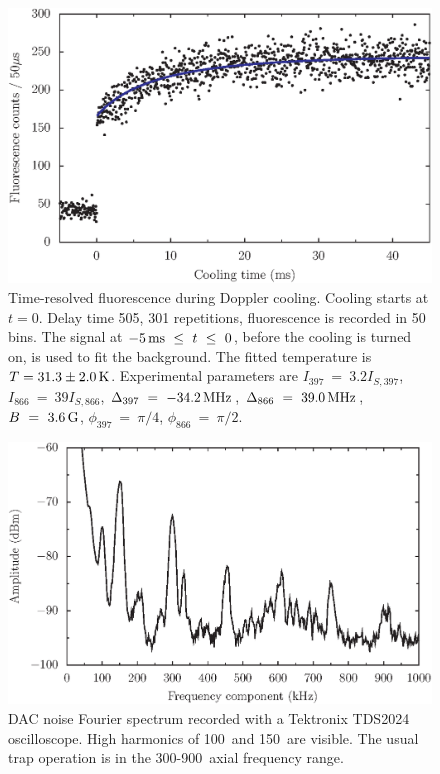 \begin{figure}[h!t]
\centering
\includegraphics{chapter7/heating/cooling_fit_v3}
\caption[Example fit of fluorescence during Doppler-cooling]{Time-resolved fluorescence during Doppler cooling. Cooling starts at $t=0$. Delay time 505\ms, 301 repetitions, fluorescence is recorded in 50\us\, bins. The signal at $-5\,\mbox{ms}~\le~t~\le~0$, before the cooling is turned on, is used to fit the background.  The fitted temperature is $T = 31.3\pm2.0\,\mbox{K}$. Experimental parameters are $I_{397}~=~3.2I_{S,397}$, $I_{866}~=~39I_{S,866}$, $\Delta_{397}~=~-34.2\,\mbox{MHz}$, $\Delta_{866}~=~39.0\,\mbox{MHz}$, $B~=~3.6\,\mbox{G}$, $\phi_{397}~=~\pi/4$, $\phi_{866}~=~\pi/2$.}
\label{fig:cooling_fit}
\end{figure} 


\begin{figure}[h!t]
\centering
\includegraphics{chapter7/noise/dacnoise_v2}
\caption[DAC noise Fourier spectrum]{DAC noise Fourier spectrum recorded with a Tektronix TDS2024 oscilloscope. High harmonics of 100\kHz\, and 150\kHz\, are visible. The usual trap operation is in the 300-900\kHz\, axial frequency range.}
\label{fig:dacnoise}
\end{figure} 

